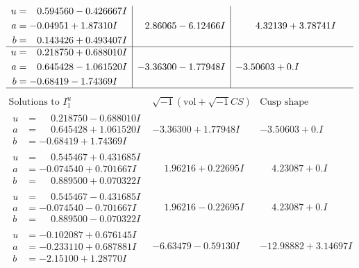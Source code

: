 \documentclass[1p]{elsarticle_modified}
\theoremstyle{definition}
\newcommand{\I}{\sqrt{-1}}
\begin{document}
$$\begin{array}{c|c|c}
\begin{aligned}
u &= \phantom{-}0.594560 - 0.426667 I \\
a &= -0.04951 + 1.87310 I \\
b &= \phantom{-}0.143426 + 0.493407 I\end{aligned}
 & \phantom{-}2.86065 - 6.12466 I & \phantom{-}4.32139 + 3.78741 I \\ \hline\begin{aligned}
u &= \phantom{-}0.218750 + 0.688010 I \\
a &= \phantom{-}0.645428 - 1.061520 I \\
b &= -0.68419 - 1.74369 I\end{aligned}
 & -3.36300 - 1.77948 I & -3.50603 + 0. I\phantom{ +0.000000I}\\
 \hline 
 \end{array}$$\newpage$$\begin{array}{c|c|c}  
\text{Solutions to }I^u_{1}& \I (\text{vol} + \sqrt{-1}CS) & \text{Cusp shape}\\
 \hline 
\begin{aligned}
u &= \phantom{-}0.218750 - 0.688010 I \\
a &= \phantom{-}0.645428 + 1.061520 I \\
b &= -0.68419 + 1.74369 I\end{aligned}
 & -3.36300 + 1.77948 I & -3.50603 + 0. I\phantom{ +0.000000I} \\ \hline\begin{aligned}
u &= \phantom{-}0.545467 + 0.431685 I \\
a &= -0.074540 + 0.701667 I \\
b &= \phantom{-}0.889500 + 0.070322 I\end{aligned}
 & \phantom{-}1.96216 + 0.22695 I & \phantom{-}4.23087 + 0. I\phantom{ +0.000000I} \\ \hline\begin{aligned}
u &= \phantom{-}0.545467 - 0.431685 I \\
a &= -0.074540 - 0.701667 I \\
b &= \phantom{-}0.889500 - 0.070322 I\end{aligned}
 & \phantom{-}1.96216 - 0.22695 I & \phantom{-}4.23087 + 0. I\phantom{ +0.000000I} \\ \hline\begin{aligned}
u &= -0.102087 + 0.676145 I \\
a &= -0.233110 + 0.687881 I \\
b &= -2.15100 + 1.28770 I\end{aligned}
 & -6.63479 - 0.59130 I & -12.98882 + 3.14697 I \\ \hline\begin{aligned}

\end{aligned}
\end{array}$$
\end{document}
